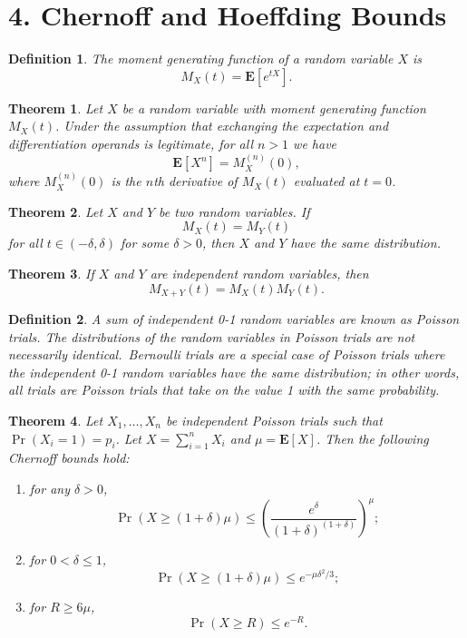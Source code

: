 \documentclass{amsart}
\newtheorem*{definition}{Definition}
\newtheorem*{theorem}{Theorem}
\newcommand{\E}{\mathbf{E}}
\begin{document}

\section*{4. Chernoff and Hoeffding Bounds}

\begin{definition}
  The \emph{moment generating function} of a random variable $X$ is
  \[
    M_X(t) = \E[e^{tX}].
  \]
\end{definition}

\begin{theorem}
  Let $X$ be a random variable with moment generating function $M_X(t)$. Under
  the assumption that exchanging the expectation and differentiation operands is
  legitimate, for all $n > 1$ we have
  \[
    \E[X^n] = M_X^{(n)}(0),
  \]
  where $M_X^{(n)}(0)$ is the \emph{$n$th derivative} of $M_X(t)$ evaluated at
  $t = 0$.
\end{theorem}

\begin{theorem}
  Let $X$ and $Y$ be two random variables. If
  \[
    M_X(t) = M_Y(t)
  \]
  for all $t \in (-\delta, \delta)$ for some $\delta > 0$, then $X$ and $Y$ have
  the same distribution.
\end{theorem}

\begin{theorem}
  If $X$ and $Y$ are independent random variables, then
  \[
    M_{X + Y}(t) = M_X(t) M_Y(t).
  \]
\end{theorem}

\begin{definition}
  A sum of independent 0-1 random variables are known as \emph{Poisson trials}. %
  The distributions of the random variables in Poisson trials are not
  necessarily identical.\ \emph{Bernoulli trials} are a special case of Poisson
  trials where the independent 0-1 random variables have the same distribution; %
  in other words, all trials are Poisson trials that take on the value 1 with
  the same probability.
\end{definition}

\begin{theorem}
  Let $X_1, \ldots, X_n$ be independent Poisson trials such that $\Pr(X_i = 1) =
  p_i$. Let $X = \sum_{i=1}^n X_i$ and $\mu = \E[X]$. Then the following
  Chernoff bounds hold:
  \begin{enumerate}
    \item for any $\delta > 0$,
      \[
        \Pr(X \geq (1 + \delta) \mu) \leq {\left( \frac{e^\delta}{{(1 +
        \delta)}^{(1 + \delta)}} \right)}^\mu;
      \]
    \item for $0 < \delta \leq 1$,
      \[
        \Pr(X \geq (1 + \delta) \mu) \leq e^{-\mu \delta^2 / 3};
      \]
    \item for $R \geq 6 \mu$,
      \[
        \Pr(X \geq R) \leq e^{-R}.
      \]
  \end{enumerate}
\end{theorem}
\end{document}
